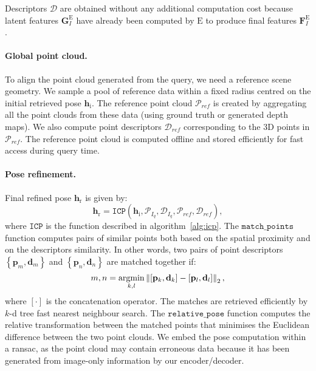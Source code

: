 \noindent Descriptors $\mathcal{D}$ are obtained without any additional computation cost because latent features $\mathbf{G}^{\mathrm{E}}_{I}$ have already been computed by $\mathrm{E}$ to produce final features $\mathbf{F}^{\mathrm{E}}_{I}$.

\paragraph{Global point cloud.} 
To align the point cloud generated from the query, we need a reference scene geometry. We sample a pool of reference data within a fixed radius centred on the initial retrieved pose $\mathbf{h}_{\mathrm{i}}$. The reference point cloud $\mathcal{P}_{ref}$ is created by aggregating all the point clouds from these data (using ground truth or generated depth maps). We also compute point descriptors $\mathcal{D}_{ref}$ corresponding to the 3D points in $\mathcal{P}_{ref}$.
\noindent The reference point cloud is computed offline and stored efficiently for fast access during query time.

\paragraph{Pose refinement.}
Final refined pose $\mathbf{h}_{\mathrm{r}}$ is given by:
\begin{equation}
	\mathbf{h}_{\mathrm{r}} = \mathtt{ICP}(\mathbf{h}_{\mathrm{i}}, \mathcal{P}_{I_q}, \mathcal{D}_{I_q}, \mathcal{P}_{ref}, \mathcal{D}_{ref}),
\end{equation}
where $\mathtt{ICP}$ is the function described in algorithm~\ref{alg:icp}. The $\mathtt{match\_points}$ function computes pairs of similar points both based on the spatial proximity and on the descriptors similarity. In other words, two pairs of point descriptors $\left\{ \mathbf{p}_m, \mathbf{d}_m \right\}$ and $\left\{ \mathbf{p}_n, \mathbf{d}_n\right\}$ are matched together if:
\begin{equation}
m, n = \underset{k, l}{\mathrm{argmin}} \left\lVert\left[\mathbf{p}_k, \mathbf{d}_k \right] - \left[\mathbf{p}_l, \mathbf{d}_l\right]\right\rVert_2,
\end{equation}
where $\left[\cdot\right]$ is the concatenation operator. The matches are retrieved efficiently by $k$-d tree fast nearest neighbour search. The $\mathtt{relative\_pose}$ function computes the relative transformation between the matched points that minimises the Euclidean difference between the two point clouds. We embed the pose computation within a \ac{ransac}, as the point cloud may contain erroneous data because it has been generated from image-only information by our encoder/decoder.

